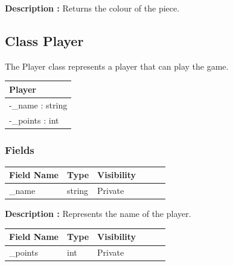 \documentclass[12pt]{article}
\begin{document}
\textbf{Description :} Returns the colour of the piece.  

\newpage


\subsection{Class Player}

The Player class represents a player that can play the game. 

\begin{table}[H]
    \begin{tabular}{|l|}
    \hline
    \rowcolor[HTML]{C0C0C0} 
    \textbf{Player}          \\ \hline
    \rowcolor[HTML]{EFEFEF}
    -\_name : string        \\ \hline
    -\_points : int         \\ \hline
    \end{tabular}
\end{table}

\subsubsection{Fields}

\begin{table}[H]
    \begin{tabular}{llllll}
    \hline
    \multicolumn{1}{|l|}{\cellcolor[HTML]{EFEFEF}\textbf{Field Name}} & \multicolumn{1}{l|}{\cellcolor[HTML]{EFEFEF}\textbf{Type}} & \multicolumn{1}{l|}{\cellcolor[HTML]{EFEFEF}\textbf{Visibility}} \\ \hline
    \multicolumn{1}{|l|}{\_name}                                      & \multicolumn{1}{l|}{string}                                & \multicolumn{1}{l|}{Private}                                     \\ \hline
    \end{tabular}
\end{table}

\textbf{Description :} Represents the name of the player.  

\begin{table}[H]
    \begin{tabular}{llllll}
    \hline
    \multicolumn{1}{|l|}{\cellcolor[HTML]{EFEFEF}\textbf{Field Name}} & \multicolumn{1}{l|}{\cellcolor[HTML]{EFEFEF}\textbf{Type}} & \multicolumn{1}{l|}{\cellcolor[HTML]{EFEFEF}\textbf{Visibility}} \\ \hline
    \multicolumn{1}{|l|}{\_points}                                      & \multicolumn{1}{l|}{int}                                 & \multicolumn{1}{l|}{Private}                                   \\ \hline
    \end{tabular}
\end{table}
\end{document}
